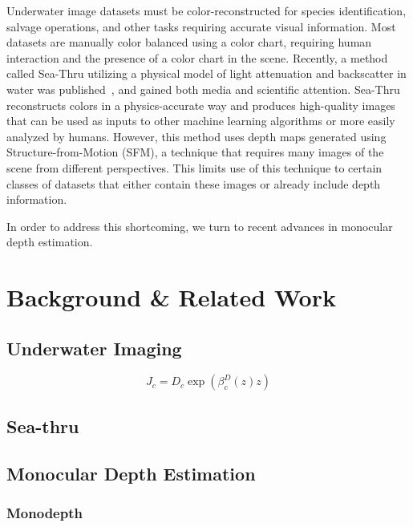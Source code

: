 \documentclass[10pt,twocolumn,letterpaper]{article}
\begin{document}
Underwater image datasets must be color-reconstructed for species identification, salvage operations, and
other tasks requiring accurate visual information. Most datasets are manually color balanced using a color
chart, requiring human interaction and the presence of a color chart in the scene. Recently, a method called
Sea-Thru utilizing a physical model of light attenuation and backscatter in water was published~\cite{seathru},
and gained both media and scientific attention. Sea-Thru reconstructs colors in a physics-accurate way and
produces high-quality images that can be used as inputs to other machine learning algorithms or more easily
analyzed by humans. However, this method uses depth maps generated using Structure-from-Motion (SFM), a technique
that requires many images of the scene from different perspectives. This limits use of this technique to certain
classes of datasets that either contain these images or already include depth information.

In order to address this shortcoming, we turn to recent advances in monocular depth estimation.

\section{Background \& Related Work}

\subsection{Underwater Imaging}


\begin{equation}
\label{eqn:scenereconstruction}
J_c = D_c \exp(\beta_c^D(z)z)
\end{equation}

\subsection{Sea-thru}

\subsection{Monocular Depth Estimation}

\subsubsection*{Monodepth}
\end{document}

